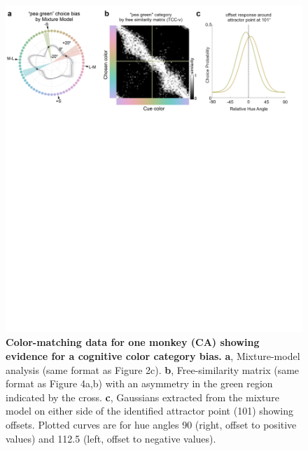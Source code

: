 \documentclass[9pt,biorxiv,lineno,onehalfspacing]{lapreprint}
\begin{document}
\begin{refsection}
\begin{figure}
    \begin{fullwidth}
    \centering
    \includegraphics[width=\textwidth+4cm,trim={0 18cm 0 0},clip]{F5_CastorCogBias_8.pdf}
    \caption{\textbf {Color-matching data for one monkey (CA) showing evidence for a cognitive color category bias.} 
    \textbf{a}, Mixture-model analysis (same format as Figure 2c). 
	\textbf{b}, Free-similarity matrix (same format as Figure 4a,b) with an asymmetry in the green region indicated by the cross.
    \textbf{c}, Gaussians extracted from the mixture model on either side of the identified attractor point (101\degree{}) showing offsets. 
    Plotted curves are for hue angles 90\degree{} (right, offset to positive values) and 112.5\degree{} (left, offset to negative values).}
    \label{fig:IndiDataCogBias}
    \end{fullwidth}
\end{figure}


\end{refsection}
\end{document}
